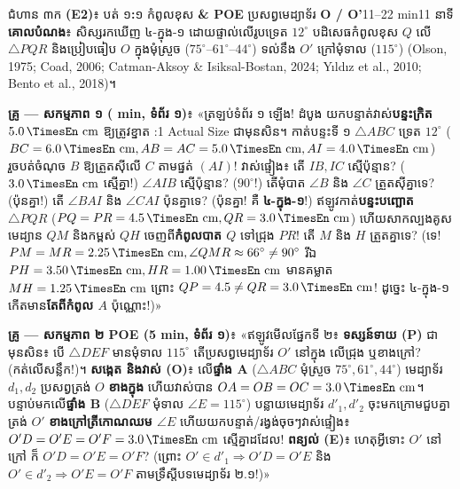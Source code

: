 \documentclass[a4paper,12pt]{article}
\newcommand{\en}[1]{{\TimesEn #1}}
\newcommand{\enbf}[1]{{\TimesEn\textbf{#1}}}
\newcommand{\unit}[1]{\,\text{\en{#1}}}
\newcommand{\tri}[1]{\ensuremath{\triangle #1}}
\newcommand{\ang}[1]{\ensuremath{\angle #1}}
\begin{document}
\Needspace{2.0cm}
\begin{phasebox}{ជំហាន ៣ក \enbf{(E2)}៖ បត់ ១\enbf{:}១ កំពូលខុស \enbf{\& POE} ប្រសព្វមេដ្យាទ័រ \enbf{O / O'}}{11--22 min}{11 នាទី}
\textbf{គោលបំណង}៖ សិស្សរកឃើញ ៤-ក្នុង-១ ដោយផ្ទាល់លើរូបទ្រេត $12^\circ$ បដិសេធកំពូលខុស $Q$ លើ $\tri{PQR}$ និងប្រៀបធៀប $O$ ក្នុងមុំស្រួច ($75^\circ\text{--}61^\circ\text{--}44^\circ$) ទល់នឹង $O'$ ក្រៅមុំទាល ($115^\circ$) \en{(Olson, 1975; Coad, 2006; Catman-Aksoy \& Isiksal-Bostan, 2024; Yıldız et al., 2010; Bento et al., 2018)}។
\end{phasebox}
\begin{scriptbox}
  \textbf{គ្រូ — សកម្មភាព ១ (\en{6 min}, ទំព័រ ១)}៖ «ត្រឡប់ទំព័រ ១ ឡើង! ដំបូង យកបន្ទាត់វាស់\textbf{បន្ទះក្រិត $5.0\unit{cm}$} ឱ្យត្រូវខ្នាត \en{1:1 Actual Size} ជាមុនសិន។ កាត់បន្ទះទី ១ $\tri{ABC}$ ទ្រេត $12^\circ$ ($BC=6.0\unit{cm}, AB=AC=5.0\unit{cm}, AI=4.0\unit{cm}$) រួចបត់ចំណុច $B$ ឱ្យត្រួតស៊ីលើ $C$ តាមផ្នត់ $(AI)$! វាស់ផ្ទៀង៖ តើ $IB, IC$ ស្មើប៉ុន្មាន? ($3.0\unit{cm}$ ស្មើគ្នា!) $\ang{AIB}$ ស្មើប៉ុន្មាន? ($90^\circ$!) តើមុំបាត $\ang{B}$ និង $\ang{C}$ ត្រួតស៊ីគ្នាទេ? (ប៉ុនគ្នា!) តើ $\ang{BAI}$ និង $\ang{CAI}$ ប៉ុនគ្នាទេ? (ប៉ុនគ្នា! គឺ \textbf{៤-ក្នុង-១}!) ឥឡូវកាត់\textbf{បន្ទះបញ្ឆោត $\tri{PQR}$} ($PQ=PR=4.5\unit{cm}, QR=3.0\unit{cm}$) ហើយសាកល្បងគូសមេដ្យាន $QM$ និងកម្ពស់ $QH$ ចេញពី\textbf{កំពូលបាត $Q$} ទៅជ្រុង $PR$! តើ $M$ និង $H$ ត្រួតគ្នាទេ? (ទេ! $PM=MR=2.25\unit{cm}, \ang{QMR}\approx 66^\circ\neq 90^\circ$ រីឯ $PH=3.50\unit{cm}, HR=1.00\unit{cm}$ មានគម្លាត $MH=1.25\unit{cm}$ ព្រោះ $QP=4.5\neq QR=3.0\unit{cm}$! ដូច្នេះ ៤-ក្នុង-១ កើតមាន\textbf{តែពីកំពូល $A$} ប៉ុណ្ណោះ!)»\par\vspace{2pt}
  \textbf{គ្រូ — សកម្មភាព ២ \en{POE (5 min}, ទំព័រ ១)}៖ «ឥឡូវមើលផ្នែកទី ២៖ \textbf{ទស្សន៍ទាយ (\en{P})} ជាមុនសិន៖ បើ $\tri{DEF}$ មានមុំទាល $115^\circ$ តើប្រសព្វមេដ្យាទ័រ $O'$ នៅក្នុង លើជ្រុង ឬខាងក្រៅ? (កត់លើសន្លឹក!)។ \textbf{សង្កេត និងវាស់ (\en{O})}៖ លើ\textbf{ផ្ទាំង \en{A}} ($\tri{ABC}$ មុំស្រួច $75^\circ, 61^\circ, 44^\circ$) មេដ្យាទ័រ $d_1, d_2$ ប្រសព្វត្រង់ $O$ \textbf{ខាងក្នុង} ហើយវាស់បាន $OA=OB=OC=3.0\unit{cm}$។ បន្ទាប់មកលើ\textbf{ផ្ទាំង \en{B}} ($\tri{DEF}$ មុំទាល $\ang{E}=115^\circ$) បន្លាយមេដ្យាទ័រ $d'_1, d'_2$ ចុះមកក្រោមជួបគ្នាត្រង់ $O'$ \textbf{ខាងក្រៅត្រីកោណឈម $\ang{E}$} ហើយយកបន្ទាត់/រង្វង់ចុចៗវាស់ផ្ទៀង៖ $O'D=O'E=O'F=3.0\unit{cm}$ ស្មើគ្នាដដែល! \textbf{ពន្យល់ (\en{E})}៖ ហេតុអ្វីទោះ $O'$ នៅក្រៅ ក៏ $O'D=O'E=O'F$? (ព្រោះ $O'\in d'_1 \Rightarrow O'D=O'E$ និង $O'\in d'_2 \Rightarrow O'E=O'F$ តាមទ្រឹស្ដីបទមេដ្យាទ័រ ២.១!)»
\end{scriptbox}
\end{document}
